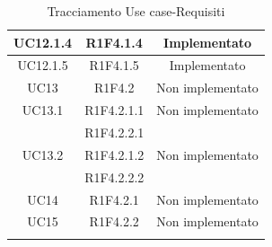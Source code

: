 \begin{longtable}{|c|c|c|}
	\hline
	UC12.1.4 & R1F4.1.4 & Implementato\\
	\hline
	UC12.1.5 & R1F4.1.5 & Implementato\\
	\hline
	UC13 & R1F4.2 & Non implementato\\
	\hline
	UC13.1 & R1F4.2.1.1 & Non implementato\\
	& R1F4.2.2.1 &\\
	\hline
	UC13.2 & R1F4.2.1.2 & Non implementato\\
	& R1F4.2.2.2 &\\
	\hline
	UC14 & R1F4.2.1 & Non implementato\\
	\hline
	UC15 & R1F4.2.2 & Non implementato\\
	\hline
	\caption[Tracciamento Use case-Requisiti]{Tracciamento Use case-Requisiti}
\end{longtable}
\clearpage
